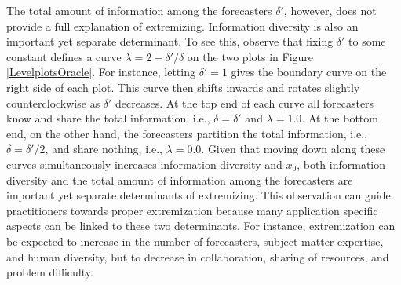 \documentclass[12pt]{article}
\theoremstyle{definition}
\theoremstyle{definition}
\begin{document}
The total amount of information among the forecasters $\delta'$, however, does not provide a full
explanation of extremizing.  Information diversity is also an
important yet separate determinant.  To see this, observe that fixing $\delta'$ to
some constant defines a curve $\lambda = 2 - \delta'/\delta$ on the two plots in  Figure \ref{LevelplotsOracle}. For
instance, letting $\delta' = 1$ gives the boundary curve on the right
side of each plot.  This curve then shifts inwards and rotates slightly
counterclockwise as $\delta'$ decreases.  At the top end of each curve
all forecasters know and share the total information, i.e., $\delta =
\delta'$ and $\lambda = 1.0$.  At the bottom end, on the other hand,
the forecasters partition the total information, i.e., $\delta =
\delta'/2$, and share nothing, i.e., $\lambda = 0.0$.  Given that
moving down along these curves simultaneously increases information diversity and
$x_0$, both information diversity and the total amount of
information among the forecasters are important yet separate determinants of  extremizing. This observation can guide practitioners towards proper extremization because  many  application specific aspects can be linked to these two determinants. For instance, extremization can be
expected to increase in the number of forecasters,
subject-matter expertise, and human diversity, but to decrease in
collaboration, sharing of resources, and problem difficulty.
 
\end{document}

